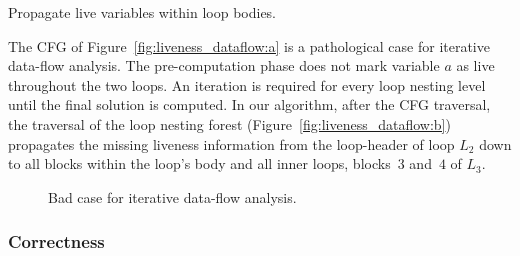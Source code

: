 \medskip
\begin{algorithm}[H]
  \caption{Propagate live variables within loop bodies.}
  \label{alg:loop_dfs}
\end{algorithm}
\medskip

\begin{example}
	The CFG of Figure~\ref{fig:liveness_dataflow:a} is a pathological case for iterative data-flow analysis.
        The pre-computation phase does not mark variable $a$ as live 
        throughout the two loops.
	An iteration is required for every loop nesting level until the final solution is computed.
	In our algorithm, after the CFG traversal, the traversal of the loop nesting forest (Figure~\ref{fig:liveness_dataflow:b}) propagates the missing liveness information from the loop-header of loop $L_2$ down to all blocks within the loop's body and all inner loops, \ie blocks~$3$ and~$4$ of $L_3$.
\end{example}

\begin{figure}[t]
   \begin{center}
     \hfill
     \hfill
     \hfill\null
   \end{center}
   \caption{Bad case for iterative data-flow analysis.}
   \label{fig:liveness_dataflow}
\end{figure}


\subsubsection{Correctness}
\label{sec:correctnessdebase}

